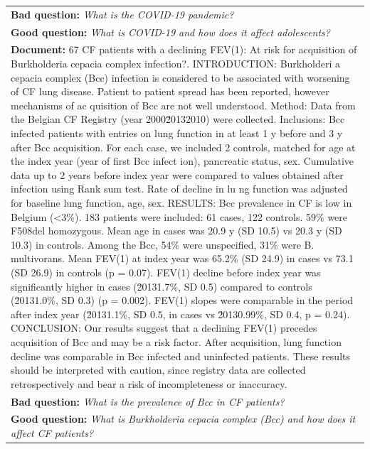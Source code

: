 \documentclass[11pt]{article}
\begin{document}
\begin{table}[htbp!]
\begin{small}
\begin{tabularx}{\textwidth}{X}
\textbf{\textcolor{orng}{Bad question:}} \textit{What is the COVID-19 pandemic?}  \\ 
\textbf{\textcolor{rd}{Good question:}}  \textit{What is COVID-19 and how does it affect adolescents?}  \\
\midrule
\textbf{\textcolor{blu}{Document:}} {\footnotesize 67 CF patients with a declining FEV(1): At risk for acquisition of Burkholderia cepacia complex infection?. INTRODUCTION: Burkholderi
a cepacia complex (Bcc) infection is considered to be associated with worsening of CF lung disease. Patient to patient spread has been reported, however mechanisms of ac
quisition of Bcc are not well understood. Method: Data from the Belgian CF Registry (year 2000\u20132010) were collected. Inclusions: Bcc infected patients with entries
on lung function in at least 1 y before and 3 y after Bcc acquisition. For each case, we included 2 controls, matched for age at the index year (year of first Bcc infect
ion), pancreatic status, sex. Cumulative data up to 2 years before index year were compared to values obtained after infection using Rank sum test. Rate of decline in lu
ng function was adjusted for baseline lung function, age, sex. RESULTS: Bcc prevalence in CF is low in Belgium (<3\%). 183 patients were included: 61 cases, 122 controls.
 59\% were F508del homozygous. Mean age in cases was 20.9 y (SD 10.5) vs 20.3 y (SD 10.3) in controls. Among the Bcc, 54\% were unspecified, 31\% were B. multivorans. Mean
FEV(1) at index year was 65.2\% (SD 24.9) in cases vs 73.1 (SD 26.9) in controls (p = 0.07). FEV(1) decline before index year was significantly higher in cases (\u20131.7\%, SD 0.5) compared to controls (\u20131.0\%, SD 0.3) (p = 0.002). FEV(1) slopes were comparable in the period after index year (\u20131.1\%, SD 0.5, in cases vs \u20130.99\%, SD 0.4, p = 0.24). CONCLUSION: Our results suggest that a declining FEV(1) precedes acquisition of Bcc and may be a risk factor. After acquisition, lung function decline was comparable in Bcc infected and uninfected patients. These results should be interpreted with caution, since registry data are collected retrospectively and bear a risk of incompleteness or inaccuracy.} \\
\textbf{\textcolor{orng}{Bad question:}} \textit{What is the prevalence of Bcc in CF patients?}  \\ 
\textbf{\textcolor{rd}{Good question:}}  \textit{What is Burkholderia cepacia complex (Bcc) and how does it affect CF patients?}  \\
\midrule

\end{tabularx}
\end{small}
\end{table}
\end{document}
